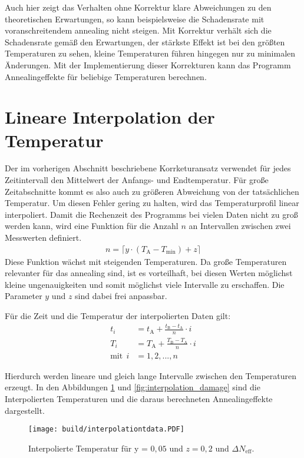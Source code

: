 Auch hier zeigt das Verhalten ohne Korrektur klare Abweichungen zu den theoretischen
Erwartungen, so kann beispielsweise die Schadensrate mit voranschreitendem annealing nicht steigen.
Mit Korrektur verhält sich die Schadensrate gemäß den Erwartungen, der stärkste
Effekt ist bei den größten Temperaturen zu sehen, kleine Temperaturen führen hingegen
nur zu minimalen Änderungen.
Mit der Implementierung dieser Korrekturen kann das Programm Annealingeffekte für
beliebige Temperaturen berechnen.



\section{Lineare Interpolation der Temperatur}
Der im vorherigen Abschnitt beschriebene Korrketuransatz verwendet für jedes
Zeitintervall den Mittelwert der Anfangs- und Endtemperatur. Für große
Zeitabschnitte kommt es also auch zu größeren Abweichung von der tatsächlichen
Temperatur. Um diesen Fehler gering zu halten, wird das Temperaturprofil
linear interpoliert.
Damit die Rechenzeit des Programms bei vielen Daten nicht zu groß werden
kann, wird eine Funktion für die Anzahl $n$ an Intervallen zwischen zwei
Messwerten definiert.
\begin{align*}
  n = \lceil{y \cdot (T_{\mathrm{A}}-T_{\mathrm{min}})+ z}\rceil \label{eqn:intervall}
\end{align*}
Diese Funktion wächst mit steigenden Temperaturen.
Da große Temperaturen relevanter für das annealing sind, ist es vorteilhaft,
bei diesen Werten möglichst kleine ungenauigkeiten und somit möglichst viele
Intervalle zu erschaffen. Die Parameter $y$ und $z$ sind dabei frei anpassbar.

Für die Zeit und die Temperatur der interpolierten Daten gilt:
\begin{align}
  t_i &= t_{\mathrm{A}} +  \frac{t_{\mathrm{B}}-t_{\mathrm{A}}}{n} \cdot i \\
  T_i &= T_{\mathrm{A}} +  \frac{T_{\mathrm{B}}-T_{\mathrm{A}}}{n} \cdot i \\
  \text{mit}\:\:i &= 1, 2, ..., n
\end{align}

Hierdurch werden lineare und gleich lange Intervalle zwischen den Temperaturen
erzeugt. In den Abbildungen \ref{fig:interpolation_N_eff} und \ref{fig:interpolation_damage} sind die Interpolierten Temperaturen und
die daraus berechneten Annealingeffekte dargestellt.

\begin{figure}
    \texttt{[image: build/interpolationtdata.PDF]}
\caption{Interpolierte Temperatur für y = $0,05$ und $z=0,2$ und $\Delta N_{\mathrm{eff}}$.}
\label{fig:interpolation_N_eff}
\end{figure}



